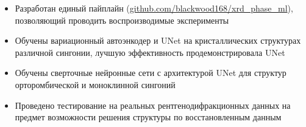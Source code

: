 \documentclass[a4paper,12pt]{article}
\begin{document}
{\begin{itemize}
\item Разработан единый пайплайн (\url{github.com/blackwood168/xrd_phase_ml}), позволяющий проводить воспроизводимые эксперименты

\item Обучены вариационный автоэнкодер и UNet на кристаллических структурах различной сингонии, лучшую эффективность продемонстрировала UNet

\item Обучены сверточные нейронные сети с архитектурой UNet для структур орторомбической и моноклинной сингоний

\item Проведено тестирование на реальных рентгенодифракционных данных на предмет возможности решения структуры по восстановленным данным

\end{itemize}
}
\end{document}
